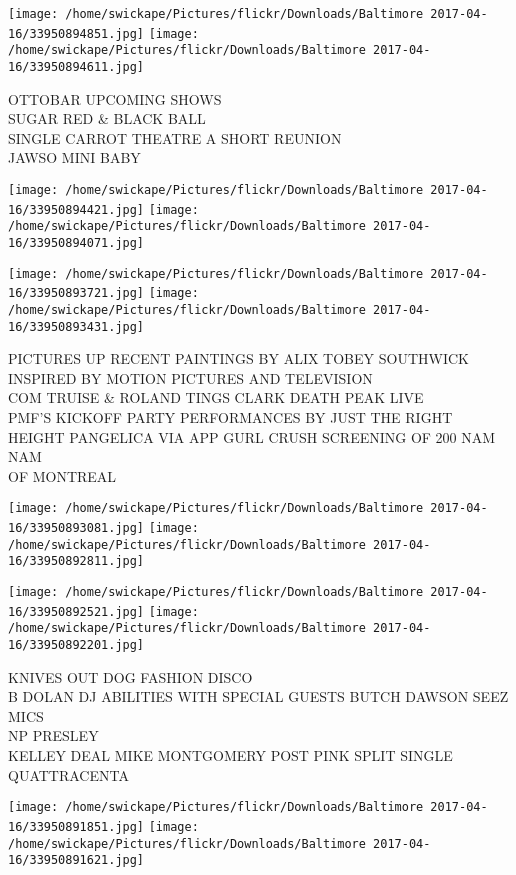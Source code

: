 \documentclass[10pt,letterpaper]{article}
\begin{document}
\texttt{[image: /home/swickape/Pictures/flickr/Downloads/Baltimore 2017-04-16/33950894851.jpg]}
\texttt{[image: /home/swickape/Pictures/flickr/Downloads/Baltimore 2017-04-16/33950894611.jpg]}

OTTOBAR UPCOMING SHOWS\\
SUGAR RED \& BLACK BALL\\
SINGLE CARROT THEATRE A SHORT REUNION\\
JAWSO MINI BABY\\
\pagebreak

\texttt{[image: /home/swickape/Pictures/flickr/Downloads/Baltimore 2017-04-16/33950894421.jpg]}
\texttt{[image: /home/swickape/Pictures/flickr/Downloads/Baltimore 2017-04-16/33950894071.jpg]}

\texttt{[image: /home/swickape/Pictures/flickr/Downloads/Baltimore 2017-04-16/33950893721.jpg]}
\texttt{[image: /home/swickape/Pictures/flickr/Downloads/Baltimore 2017-04-16/33950893431.jpg]}

PICTURES UP RECENT PAINTINGS BY ALIX TOBEY SOUTHWICK INSPIRED BY MOTION PICTURES AND TELEVISION\\
COM TRUISE \& ROLAND TINGS CLARK DEATH PEAK LIVE\\
PMF'S KICKOFF PARTY PERFORMANCES BY JUST THE RIGHT HEIGHT PANGELICA VIA APP GURL CRUSH SCREENING OF 200 NAM NAM\\
OF MONTREAL\\
\pagebreak

\texttt{[image: /home/swickape/Pictures/flickr/Downloads/Baltimore 2017-04-16/33950893081.jpg]}
\texttt{[image: /home/swickape/Pictures/flickr/Downloads/Baltimore 2017-04-16/33950892811.jpg]}

\texttt{[image: /home/swickape/Pictures/flickr/Downloads/Baltimore 2017-04-16/33950892521.jpg]}
\texttt{[image: /home/swickape/Pictures/flickr/Downloads/Baltimore 2017-04-16/33950892201.jpg]}

KNIVES OUT DOG FASHION DISCO\\
B DOLAN DJ ABILITIES WITH SPECIAL GUESTS BUTCH DAWSON SEEZ MICS\\
NP PRESLEY\\
KELLEY DEAL MIKE MONTGOMERY POST PINK SPLIT SINGLE QUATTRACENTA\\
\pagebreak

\texttt{[image: /home/swickape/Pictures/flickr/Downloads/Baltimore 2017-04-16/33950891851.jpg]}
\texttt{[image: /home/swickape/Pictures/flickr/Downloads/Baltimore 2017-04-16/33950891621.jpg]}
\end{document}
